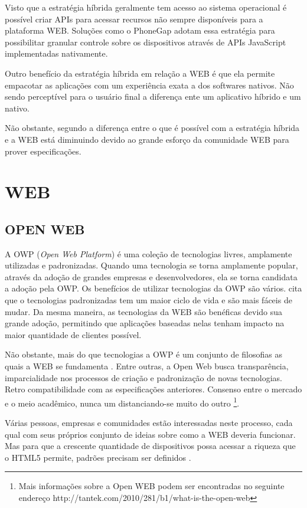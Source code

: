 Visto que a estratégia híbrida geralmente tem acesso ao sistema
operacional é possível criar APIs para acessar recursos não sempre
disponíveis para a plataforma WEB. Soluções como o PhoneGap
adotam essa estratégia para possibilitar granular controle sobre os
dispositivos através de APIs JavaScript implementadas nativamente.

Outro benefício da estratégia híbrida em relação a WEB é que
ela permite empacotar as aplicações com um experiência exata a dos
softwares nativos. Não sendo perceptível para o usuário final a
diferença ente um aplicativo híbrido e um nativo.

Não obstante, segundo \cite[pp. 8]{aSeriousContender} a diferença
entre o que é possível com a estratégia híbrida e a WEB está
diminuindo devido ao grande esforço da comunidade WEB para prover
especificações.

\section{WEB}

\subsection{OPEN WEB}

A OWP (\textit{Open Web Platform}) é uma coleção de tecnologias
livres, amplamente utilizadas e padronizadas. Quando uma tecnologia
se torna amplamente popular, através da adoção de grandes empresas
e desenvolvedores, ela se torna candidata a adoção pela OWP. Os
benefícios de utilizar tecnologias da OWP são vários. \cite[pp.
3]{svgTime} cita que o tecnologias padronizadas tem um maior ciclo de
vida e são mais fáceis de mudar. Da mesma maneira, as tecnologias
da WEB são benéficas devido sua grande adoção, permitindo que
aplicações baseadas nelas tenham impacto na maior quantidade de
clientes possível.

Não obstante, mais do que tecnologias a OWP é um conjunto de
filosofias as quais a WEB se fundamenta \autocite{openWebDefinition}. Entre outras, a Open Web
busca transparência, imparcialidade nos processos de criação
e padronização de novas tecnologias. Retro compatibilidade com
as especificações anteriores. Consenso entre o mercado e o meio
acadêmico, nunca um distanciando-se muito do outro \footnote{Mais
informações sobre a Open WEB podem ser encontradas no seguinte
endereço http://tantek.com/2010/281/b1/what-is-the-open-web}.

Várias pessoas, empresas e comunidades estão interessadas neste
processo, cada qual com seus próprios conjunto de ideias sobre como
a WEB deveria funcionar. Mas para que a crescente quantidade de
dispositivos possa acessar a riqueza que o HTML5 permite, padrões
precisam ser definidos \autocite[pp. 5]{aSeriousContender}.

